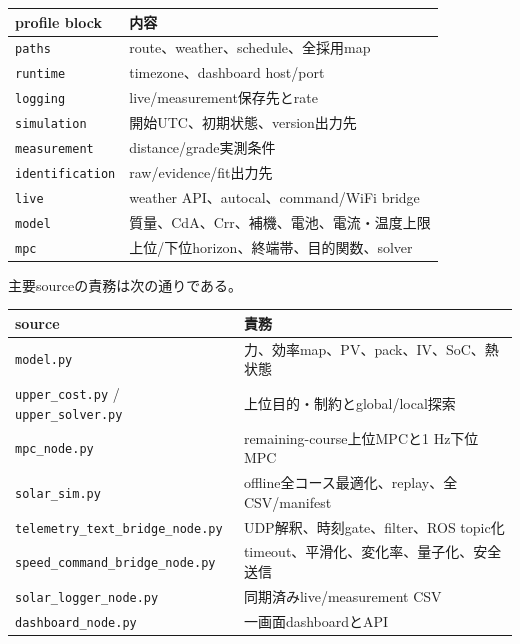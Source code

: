 \documentclass[
  japanese,
  a4paper,
]{article}
\newcounter{none} %
\begin{document}
{\def\LTcaptype{none} %
\begin{longtable}[]{@{}ll@{}}
\toprule\noalign{}
profile block & 内容 \\
\midrule\noalign{}
\endhead
\bottomrule\noalign{}
\endlastfoot
\texttt{paths} & route、weather、schedule、全採用map \\
\texttt{runtime} & timezone、dashboard host/port \\
\texttt{logging} & live/measurement保存先とrate \\
\texttt{simulation} & 開始UTC、初期状態、version出力先 \\
\texttt{measurement} & distance/grade実測条件 \\
\texttt{identification} & raw/evidence/fit出力先 \\
\texttt{live} & weather API、autocal、command/WiFi bridge \\
\texttt{model} & 質量、CdA、Crr、補機、電池、電流・温度上限 \\
\texttt{mpc} & 上位/下位horizon、終端帯、目的関数、solver \\
\end{longtable}
}

主要sourceの責務は次の通りである。

{\def\LTcaptype{none} %
\begin{longtable}[]{@{}
  >{\raggedright\arraybackslash}p{}
  >{\raggedright\arraybackslash}p{}@{}}
\toprule\noalign{}
\begin{minipage}[b]{\linewidth}\raggedright
source
\end{minipage} & \begin{minipage}[b]{\linewidth}\raggedright
責務
\end{minipage} \\
\midrule\noalign{}
\endhead
\bottomrule\noalign{}
\endlastfoot
\texttt{model.py} & 力、効率map、PV、pack、IV、SoC、熱状態 \\
\texttt{upper\_cost.py} / \texttt{upper\_solver.py} &
上位目的・制約とglobal/local探索 \\
\texttt{mpc\_node.py} & remaining-course上位MPCと1 Hz下位MPC \\
\texttt{solar\_sim.py} &
offline全コース最適化、replay、全CSV/manifest \\
\texttt{telemetry\_text\_bridge\_node.py} &
UDP解釈、時刻gate、filter、ROS topic化 \\
\texttt{speed\_command\_bridge\_node.py} &
timeout、平滑化、変化率、量子化、安全送信 \\
\texttt{solar\_logger\_node.py} & 同期済みlive/measurement CSV \\
\texttt{dashboard\_node.py} & 一画面dashboardとAPI \\
\end{longtable}
}
\end{document}
